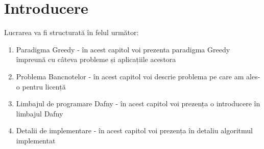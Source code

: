 \chapter*{Introducere} 

Lucrarea va fi structurată în felul următor: 
\begin{enumerate}
	\item Paradigma Greedy - în acest capitol voi prezenta paradigma Greedy împreună cu câteva probleme și aplicațiile acestora
	\item Problema Bancnotelor - în acest capitol voi descrie problema pe care am ales-o pentru licență
	\item Limbajul de programare Dafny - în acest capitol voi prezența o introducere în limbajul Dafny
	\item Detalii de implementare - în acest capitol voi prezența în detaliu algoritmul implementat
\end{enumerate}
